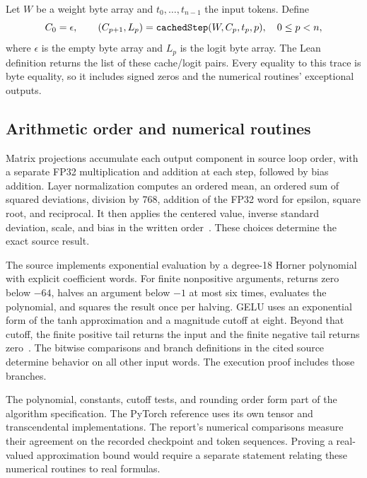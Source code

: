 Let $W$ be a weight byte array and $t_0,\ldots,t_{n-1}$ the input tokens.  Define
\begin{equation}\label{eq:recurrence}
C_0=\epsilon,\qquad
(C_{p+1},L_p)=\texttt{cachedStep}(W,C_p,t_p,p),\quad 0\leq p<n,
\end{equation}
where $\epsilon$ is the empty byte array and $L_p$ is the logit byte array.  The Lean definition  returns the list of these cache/logit pairs.  Every equality to this trace is byte equality, so it includes signed zeros and the numerical routines' exceptional outputs.

\subsection{Arithmetic order and numerical routines}

Matrix projections accumulate each output component in source loop order, with a separate FP32 multiplication and addition at each step, followed by bias addition.  Layer normalization computes an ordered mean, an ordered sum of squared deviations, division by 768, addition of the FP32 word  for epsilon, square root, and reciprocal.  It then applies the centered value, inverse standard deviation, scale, and bias in the written order~\cite{kernels}.  These choices determine the exact source result.

The source implements exponential evaluation by a degree-18 Horner polynomial with explicit coefficient words.  For finite nonpositive arguments,  returns zero below $-64$, halves an argument below $-1$ at most six times, evaluates the polynomial, and squares the result once per halving.  GELU uses an exponential form of the tanh approximation and a magnitude cutoff at eight.  Beyond that cutoff, the finite positive tail returns the input and the finite negative tail returns zero~\cite{numerics}.  The bitwise comparisons and branch definitions in the cited source determine behavior on all other input words.  The execution proof includes those branches.

The polynomial, constants, cutoff tests, and rounding order form part of the algorithm specification.  The PyTorch reference uses its own tensor and transcendental implementations.  The report's numerical comparisons measure their agreement on the recorded checkpoint and token sequences.  Proving a real-valued approximation bound would require a separate statement relating these numerical routines to real formulas.

